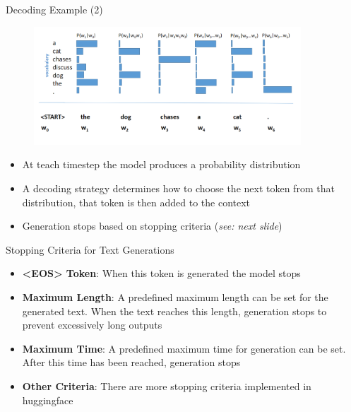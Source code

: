 \begin{vbframe}{Decoding Example (2)}

\begin{figure}
    \centering
    \includegraphics[width=10cm]{figure/arlm.png}
\end{figure}

\begin{itemize}
    \item At teach timestep the model produces a probability distribution
    \item A decoding strategy determines how to choose the next token from that distribution, that token is then added to the context
    \item Generation stops based on stopping criteria (\textit{see: next slide})
\end{itemize}
    
\end{vbframe}



\begin{vbframe}{Stopping Criteria for Text Generations}

\vfill

\begin{itemize}
    \item \textbf{<EOS> Token}: When this token is generated the model stops
    \item \textbf{Maximum Length}: A predefined maximum length can be set for the generated text. When the text reaches this length, generation stops to prevent excessively long outputs
    \item \textbf{Maximum Time}: A predefined maximum time for generation can be set. After this time has been reached, generation stops
    \item \textbf{Other Criteria}: There are more stopping criteria implemented in huggingface 
\end{itemize}

\vfill

\end{vbframe}

